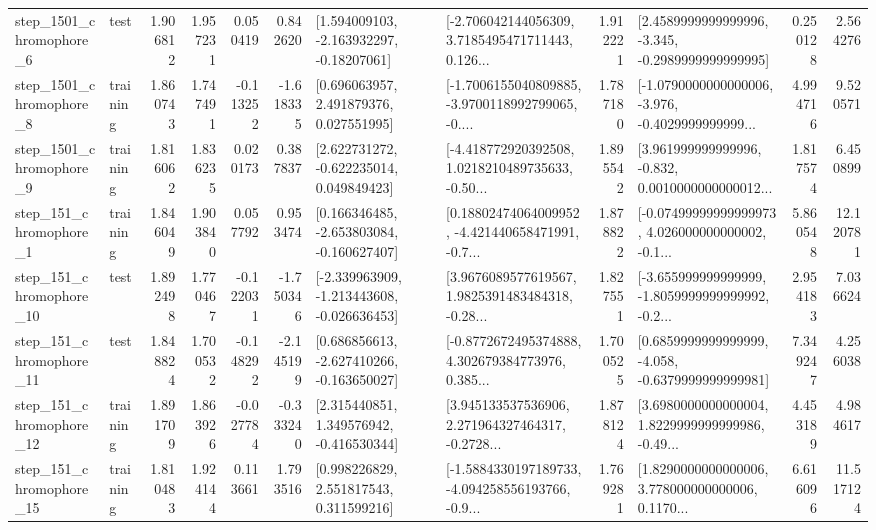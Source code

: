 \begin{tabular}{llrrrrllrlrr}
  step\_1501\_chromophore\_6 &      test &      1.906812 &    1.957231 &      0.050419 &  0.842620 &    [1.594009103, -2.163932297, -0.18207061] &  [-2.706042144056309, 3.7185495471711443, 0.126... &       1.912221 &  [2.4589999999999996, -3.345, -0.2989999999999995] &            0.250128 &          2.564276 \\
  step\_1501\_chromophore\_8 &  training &      1.860743 &    1.747491 &     -0.113252 & -1.618335 &     [0.696063957, 2.491879376, 0.027551995] &  [-1.7006155040809885, -3.9700118992799065, -0.... &       1.787180 &  [-1.0790000000000006, -3.976, -0.4029999999999... &            4.994716 &          9.520571 \\
  step\_1501\_chromophore\_9 &  training &      1.816062 &    1.836235 &      0.020173 &  0.387837 &    [2.622731272, -0.622235014, 0.049849423] &  [-4.418772920392508, 1.0218210489735633, -0.50... &       1.895542 &  [3.961999999999996, -0.832, 0.0010000000000012... &            1.817574 &          6.450899 \\
   step\_151\_chromophore\_1 &  training &      1.846049 &    1.903840 &      0.057792 &  0.953474 &   [0.166346485, -2.653803084, -0.160627407] &  [0.18802474064009952, -4.421440658471991, -0.7... &       1.878822 &  [-0.07499999999999973, 4.026000000000002, -0.1... &            5.860548 &         12.120781 \\
  step\_151\_chromophore\_10 &      test &      1.892498 &    1.770467 &     -0.122031 & -1.750346 &  [-2.339963909, -1.213443608, -0.026636453] &  [3.9676089577619567, 1.9825391483484318, -0.28... &       1.827551 &  [-3.655999999999999, -1.8059999999999992, -0.2... &            2.954183 &          7.036624 \\
  step\_151\_chromophore\_11 &      test &      1.848824 &    1.700532 &     -0.148292 & -2.145199 &   [0.686856613, -2.627410266, -0.163650027] &  [-0.8772672495374888, 4.302679384773976, 0.385... &       1.700525 &  [0.6859999999999999, -4.058, -0.6379999999999981] &            7.349247 &          4.256038 \\
  step\_151\_chromophore\_12 &  training &      1.891709 &    1.863926 &     -0.027784 & -0.333240 &    [2.315440851, 1.349576942, -0.416530344] &  [3.945133537536906, 2.271964327464317, -0.2728... &       1.878124 &  [3.6980000000000004, 1.8229999999999986, -0.49... &            4.453189 &          4.984617 \\
  step\_151\_chromophore\_15 &  training &      1.810483 &    1.924144 &      0.113661 &  1.793516 &     [0.998226829, 2.551817543, 0.311599216] &  [-1.5884330197189733, -4.094258556193766, -0.9... &       1.769281 &  [1.8290000000000006, 3.778000000000006, 0.1170... &            6.616096 &         11.517124 \\

\end{tabular}
